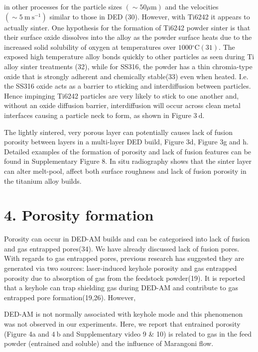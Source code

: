 \documentclass[10pt]{article}
\begin{document}
in other processes for the particle sizes $(\sim 50 \mu \mathrm{m})$ and the velocities $\left(\sim 5 \mathrm{~m} \mathrm{~s}^{-1}\right)$ similar to those in DED (30). However, with Ti6242 it appears to actually sinter. One hypothesis for the formation of Ti6242 powder sinter is that their surface oxide dissolves into the alloy as the powder surface heats due to the increased solid solubility of oxygen at temperatures over $1000{ }^{\circ} \mathrm{C}(31)$. The exposed high temperature alloy bonds quickly to other particles as seen during Ti alloy sinter treatments (32), while for SS316, the powder has a thin chromia-type oxide that is strongly adherent and chemically stable(33) even when heated. I.e. the SS316 oxide acts as a barrier to sticking and interdiffusion between particles. Hence impinging Ti6242 particles are very likely to stick to one another and, without an oxide diffusion barrier, interdiffusion will occur across clean metal interfaces causing a particle neck to form, as shown in Figure $3 \mathrm{~d}$.

The lightly sintered, very porous layer can potentially causes lack of fusion porosity between layers in a multi-layer DED build, Figure 3d, Figure 3g and h. Detailed examples of the formation of porosity and lack of fusion features can be found in Supplementary Figure 8. In situ radiography shows that the sinter layer can alter melt-pool, affect both surface roughness and lack of fusion porosity in the titanium alloy builds.

\section*{4. Porosity formation}
Porosity can occur in DED-AM builds and can be categorised into lack of fusion and gas entrapped pores(34). We have already discussed lack of fusion pores. With regards to gas entrapped pores, previous research has suggested they are generated via two sources: laser-induced keyhole porosity and gas entrapped porosity due to absorption of gas from the feedstock powder(19). It is reported that a keyhole can trap shielding gas during DED-AM and contribute to gas entrapped pore formation(19,26). However,

DED-AM is not normally associated with keyhole mode and this phenomenon was not observed in our experiments. Here, we report that entrained porosity (Figure 4a and $4 \mathrm{~b}$ and Supplementary video 9 \& 10) is related to gas in the feed powder (entrained and soluble) and the influence of Marangoni flow.
\end{document}

